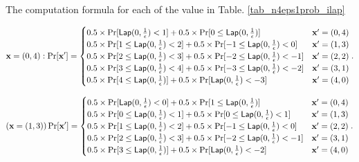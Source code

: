 \documentclass{article}
\begin{document}
{The computation formula for each of the value in Table. \ref{tab_n4eps1prob_ilap}
{\scriptsize

\[
\dataobs = (0,4): \Pr[\dataobs']
= \begin{cases}
	0.5 \times 
 	\Pr[	\lap{0}{\frac{1}{\epsilon}}	<	1] 
 	+ 	
 	0.5 \times 
 	\Pr[	0	\leq \lap{0}{\frac{1}{\epsilon}}] 
%
	& \dataobs' = (0, 4)\\
%
 	0.5 \times 
 	\Pr[	1	\leq \lap{0}{\frac{1}{\epsilon}}	<	2] 
 	+ 	
 	0.5 \times 
 	\Pr[	-1	\leq \lap{0}{\frac{1}{\epsilon}}	<	0] 
%
	& \dataobs' = (1, 3)\\
%
 	0.5 \times 
 	\Pr[	2	\leq	\lap{0}{\frac{1}{\epsilon}}	<	3] 
 	+ 	
 	0.5 \times 
 	\Pr[	-2	\leq \lap{0}{\frac{1}{\epsilon}}	<	-1] 
%
	& \dataobs' = (2, 2)\\
%
 	0.5 \times 
 	\Pr[	3	\leq	\lap{0}{\frac{1}{\epsilon}}	< 4]
 	+ 	
 	0.5 \times 
 	\Pr[	-3	\leq	\lap{0}{\frac{1}{\epsilon}}	<	-2] 
%
	& \dataobs' = (3, 1)\\
%
 	0.5 \times 
 	\Pr[	4	\leq	\lap{0}{\frac{1}{\epsilon}}]
 	+ 	
 	0.5 \times 
 	\Pr[	\lap{0}{\frac{1}{\epsilon}}	<	-3] 
%
	& \dataobs' = (4, 0)
\end{cases}.
\]

\[
(\dataobs = (1,3)) \Pr[\dataobs']
= \begin{cases}
 	0.5 \times 
 	\Pr[	\lap{0}{\frac{1}{\epsilon}}	<	0] 
 	+ 	
 	0.5 \times 
 	\Pr[	1	\leq \lap{0}{\frac{1}{\epsilon}}] 
	& \dataobs' = (0, 4)\\
%
 	0.5 \times 
 	\Pr[	0	\leq \lap{0}{\frac{1}{\epsilon}}	<	1] 
 	+ 	
 	0.5 \times 
 	\Pr[	0	\leq \lap{0}{\frac{1}{\epsilon}}	<	1] 
	& \dataobs' = (1, 3)\\
%
 	0.5 \times 
 	\Pr[	1	\leq	\lap{0}{\frac{1}{\epsilon}}	<	2] 
 	+ 	
 	0.5 \times 
 	\Pr[	-1	\leq \lap{0}{\frac{1}{\epsilon}}	<	0] 
	& \dataobs' = (2, 2)\\
%
 	0.5 \times 
 	\Pr[	2	\leq	\lap{0}{\frac{1}{\epsilon}}	<	3] 
 	+ 	
 	0.5 \times 
 	\Pr[	-2	\leq	\lap{0}{\frac{1}{\epsilon}}	<	-1] 
	& \dataobs' = (3, 1)\\
 	0.5 \times 
 	\Pr[	3	\leq	\lap{0}{\frac{1}{\epsilon}}] 
 	+ 	
 	0.5 \times 
 	\Pr[	\lap{0}{\frac{1}{\epsilon}}	<	-2] 
	& \dataobs' = (4, 0)
\end{cases}.
\]



}}
\end{document}
